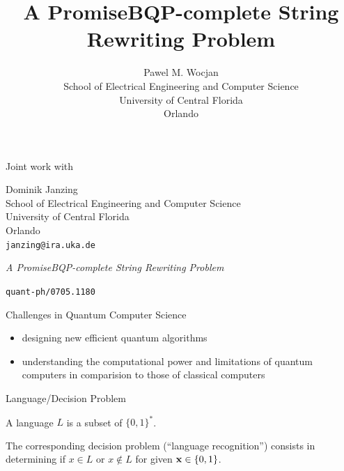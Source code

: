 \documentclass[slideColor]{prosper}
\title{A PromiseBQP-complete String\\ Rewriting Problem}
\author{Pawel M. Wocjan\\[1ex]School of Electrical Engineering and Computer Science\\ University of Central Florida\\Orlando}
\renewcommand{\>}{\rangle}
\newcommand{\<}{\langle}
\begin{document}
\maketitle


\begin{slide}{Joint work with}
\begin{center}
Dominik Janzing\\[1ex]
School of Electrical Engineering and Computer Science\\[0.5ex]
University of Central Florida\\[0.5ex]
Orlando\\[0.5ex]
\texttt{janzing@ira.uka.de}

\bigskip

\bigskip
{\em A PromiseBQP-complete String Rewriting Problem}

\texttt{quant-ph/0705.1180}
\end{center}
\end{slide}


\begin{slide}{Challenges in Quantum Computer Science}

\begin{itemize}
\item designing new efficient quantum algorithms
\item	understanding the computational power and limitations of quantum computers in comparision to those of classical computers 
\end{itemize}

\end{slide}


\begin{slide}{Language/Decision Problem}

A language $L$ is a subset of $\{0,1\}^*$. 

\medskip
The corresponding decision problem (``language recognition'') consists in determining if $x\in L$ or $x\not\in L$ for given ${\bf x}\in\{0,1\}$.

\end{slide}

\end{document}
